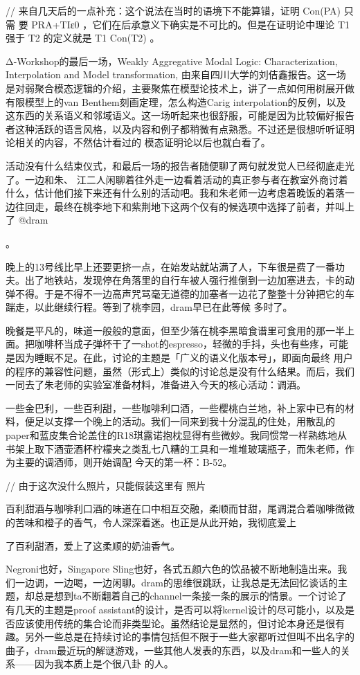 \documentclass{article}
\begin{document}
// 来自几天后的一点补充：这个说法在当时的语境下不能算错，证明 Con(PA) 只需
\newpage
要 PRA+TIε0 ，它们在后承意义下确实是不可比的。但是在证明论中理论 T1 强于 T2
 的定义就是 T1 Con(T2) 。 

Δ-Workshop的最后一场，Weakly Aggregative Modal Logic: Characterization, Interpolation and Model transformation, 由来自四川大学的刘佶鑫报告。这一场是对弱聚合模态逻辑的介绍，主要聚焦在模型论技术上，讲了一点如何用树展开做有限模型上的van Benthem刻画定理，怎么构造Carig interpolation的反例，以及这东西的关系语义和邻域语义。这一场听起来也很舒服，可能是因为比较偏好报告者这种活跃的语言风格，以及内容和例子都稍微有点熟悉。不过还是很想听听证明论相关的内容，不然估计看过的
模态证明论以后也就白看了。 

活动没有什么结束仪式，和最后一场的报告者随便聊了两句就发觉人已经彻底走光了。一边和朱、
\newpage
江二人闲聊着往外走一边看着活动的真正参与者在教室外商讨着什么，估计他们接下来还有什么别的活动吧。我和朱老师一边考虑着晚饭的着落一边往回走，最终在桃李地下和紫荆地下这两个仅有的候选项中选择了前者，并叫上了 
@dram

 。 

晚上的13号线比早上还要更挤一点，在始发站就站满了人，下车很是费了一番功夫。出了地铁站，发现停在角落里的自行车被人强行推倒到一边加塞进去，卡的动弹不得。于是不得不一边高声咒骂毫无道德的加塞者一边花了整整十分钟把它的车踹走，以此继续行程。等到了桃李园，dram早已在此等候
多时了。 

晚餐是平凡的，味道一般般的意面，但至少落在桃李黑暗食谱里可食用的那一半上面。把咖啡杯当成子弹杯干了一shot的espresso，轻微的手抖，头也有些疼，可能是因为睡眠不足。在此，讨论的主题是「广义的语义化版本号」，即面向最终
\newpage
用户的程序的兼容性问题，虽然（形式上）类似的讨论总是没有什么结果。而后，我们一同去了朱老师的实验室准备材料，准备进入今天的核心活动：调酒。
 

一些金巴利，一些百利甜，一些咖啡利口酒，一些樱桃白兰地，补上家中已有的材料，便足以支撑一个晚上的活动。我们一同来到我十分混乱的住处，用散乱的paper和蓝皮集合论盖住的R18琪露诺抱枕显得有些微妙。我同惯常一样熟练地从书架上取下酒壶酒杯柠檬夹之类乱七八糟的工具和一堆堆玻璃瓶子，而朱老师，作为主要的调酒师，则开始调配
今天的第一杯：B-52。 

// 由于这次没什么照片，只能假装这里有
照片 

百利甜酒与咖啡利口酒的味道在口中相互交融，柔顺而甘甜，尾调混合着咖啡微微的苦味和橙子的香气，令人深深着迷。也正是从此开始，我彻底爱上

\newpage
了百利甜酒，爱上了这柔顺的奶油香气。 

Negroni也好，Singapore Sling也好，各式五颜六色的饮品被不断地制造出来。我们一边调，一边喝，一边闲聊。dram的思维很跳跃，让我总是无法回忆谈话的主题，却总是想到ta不断翻着自己的channel一条接一条的展示的情景。一个讨论了有几天的主题是proof assistant的设计，是否可以将kernel设计的尽可能小，以及是否应该使用传统的集合论而非类型论。虽然结论是显然的，但讨论本身还是很有趣。另外一些总是在持续讨论的事情包括但不限于一些大家都听过但叫不出名字的曲子，dram最近玩的解谜游戏，一些其他人发表的东西，以及dram和一些人的关系——因为我本质上是个很八卦
的人。 
\end{document}
